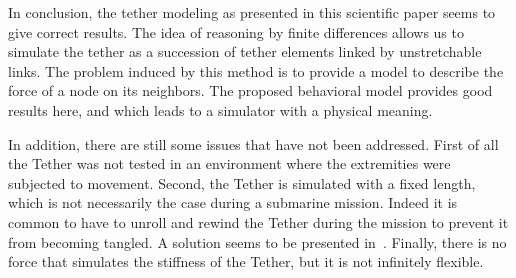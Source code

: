 In conclusion, the tether modeling as presented in this scientific paper seems to give correct results. The idea of reasoning by finite differences allows us to simulate the tether as a succession of tether elements linked by unstretchable links. The problem induced by this method is to provide a model to describe the force of a node on its neighbors. The proposed behavioral model provides good results here, and which leads to a simulator with a physical meaning.

In addition, there are still some issues that have not been addressed. First of all the Tether was not tested in an environment where the extremities were subjected to movement. Second, the Tether is simulated with a fixed length, which is not necessarily the case during a submarine mission. Indeed it is common to have to unroll and rewind the Tether during the mission to prevent it from becoming tangled. A solution seems to be presented in~\cite{ganoni_visually_2018}.  Finally, there is no force that simulates the stiffness of the Tether, but it is not infinitely flexible.